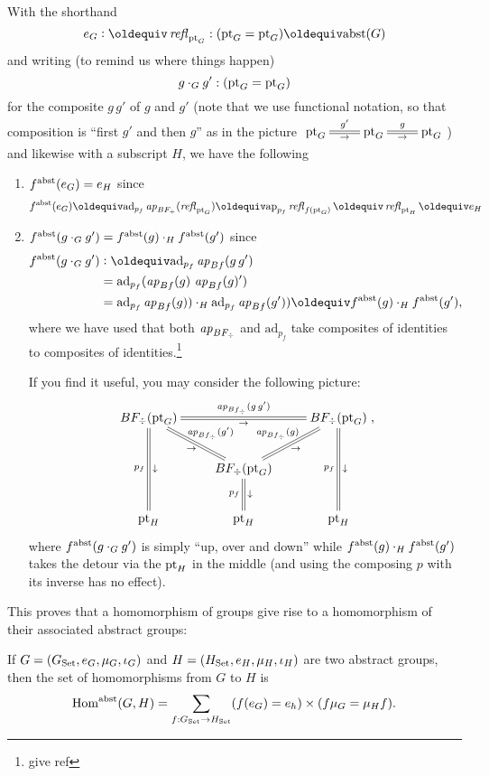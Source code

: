 \begin{definition}
With the shorthand $$e_G\defequi\refl{\pt_G}:(\pt_G=\pt_G)\oldequiv\abstr(G)$$ and writing (to remind us where things happen)
$$g\cdot_Gg':({\mathord{\mathrm{pt}}}_G={\mathord{\mathrm{pt}}}_G)$$
 for the composite $g\,g'$ of $g$ and $g'$ (note that we use functional notation, so that composition is ``first $g'$ and then $g$'' as in the picture 
$\xymatrix{\pt_G\ar@{=}[r]^{g'}_\to&\pt_G\ar@{=}[r]^{g}_\to&\pt_G}$) %
and likewise with a subscript $H$, we have the following
  \begin{enumerate}
  \item $f^{\mathrm{abst}}(e_G)= e_H$ since
$$f^\abstr(e_G)\oldequiv\mathrm{ad}_{p_f}\ap{BF_\div}(\refl{\pt_G})\oldequiv\mathrm{ap}_{p_f}\refl{f(\pt_G)}\oldequiv\refl{\pt_H}\oldequiv e_H
$$
      \item $f^{\mathrm{abst}}(g\cdot_Gg')=f^{\mathrm{abst}}(g)\cdot_Hf^{\mathrm{abst}}(g')$ since
        \begin{align*}
          f^\abstr(g\cdot_Gg')&\defequi %
            \mathrm{ad}_{p_f}\ap{Bf}(g\, g')\\
          &=\mathrm{ad}_{p_f}(\ap{Bf}(g)\,\ap{Bf}(g)')\\
          &=\mathrm{ad}_{p_f}\ap{Bf}(g))\cdot_H\mathrm{ad}_{p_f}\ap{Bf}(g'))\oldequiv f^\abstr(g)\cdot_Hf^\abstr(g'),
        \end{align*}
where we have used that both $\mathop{{\it ap}_{BF_\div}}$ and $\mathrm{ad}_{p_f}$ take composites of identities to composites of identities.\footnote{give ref}

If you find it useful, you may consider the following picture:
$$\xymatrix{
BF_\div(\pt_G)\ar@{=}[rr]^{\ap{Bf_\div}(g\, g')}_\to\ar@{=}[dr]^{\ap{Bf_\div}(g')}_\to\ar@{=}[dd]_{p_f}^\downarrow
&&BF_\div(\pt_G)\ar@{=}[dd]_{p_f}^\downarrow\\
&BF_\div(\pt_G)\ar@{=}[d]_{p_f}^\downarrow
\ar@{=}[ur]^{\ap{Bf_\div}(g)}_\to
&\\
\pt_H&\pt_H&\pt_H},$$
where $f^{\mathrm{abst}}(g\cdot_Gg')$ is simply ``up, over and down'' while $f^{\mathrm{abst}}(g)\cdot_Hf^{\mathrm{abst}}(g')$ takes the detour via the ${\mathord{\mathrm{pt}}}_H$ in the middle (and using the composing $p$ with its inverse has no effect).
  \end{enumerate}
\end{definition}
This proves that a homomorphism of groups give rise to a homomorphism of their associated abstract groups:
\begin{definition}
  If $G=(G_{\mathord{\mathrm{Set}}},e_G,\mu_G,\iota_G)$ and $H=(H_{\mathord{\mathrm{Set}}},e_H,\mu_H,\iota_H)$ are two abstract groups, then the set of homomorphisms from $G$ to $H$ is
$$\mathrm{Hom}^{\mathrm{abst}}(G,H)=\sum_{f:G_{\mathord{\mathrm{Set}}}\to H_{\mathord{\mathrm{Set}}}}(f(e_G)=e_h)\times (f\mu_G=\mu_Hf).
$$
\end{definition}



